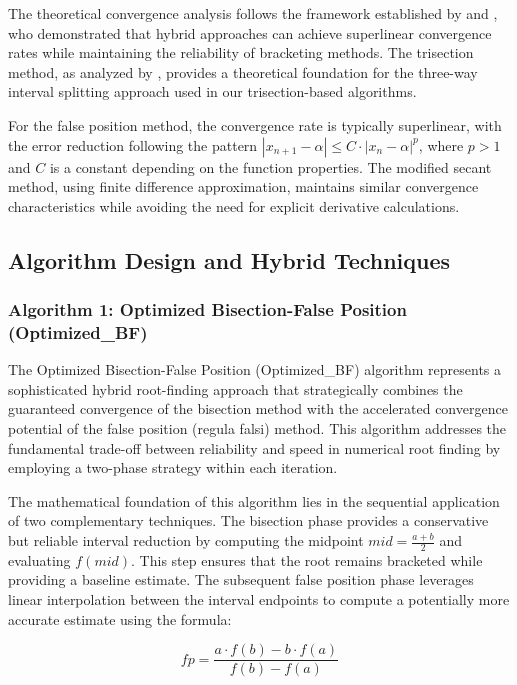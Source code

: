 \documentclass[amsmath, amssymb, aps]{revtex4-2}
\begin{document}
The theoretical convergence analysis follows the framework established by \cite{sabharwal2019blended} and \cite{badr2022novel}, who demonstrated that hybrid approaches can achieve superlinear convergence rates while maintaining the reliability of bracketing methods. The trisection method, as analyzed by \cite{demir2008trisection}, provides a theoretical foundation for the three-way interval splitting approach used in our trisection-based algorithms.

For the false position method, the convergence rate is typically superlinear, with the error reduction following the pattern $|x_{n+1} - \alpha| \leq C \cdot |x_n - \alpha|^p$, where $p > 1$ and $C$ is a constant depending on the function properties. The modified secant method, using finite difference approximation, maintains similar convergence characteristics while avoiding the need for explicit derivative calculations.

\subsection{Algorithm Design and Hybrid Techniques}

\subsubsection{Algorithm 1: Optimized Bisection-False Position (Optimized\_BF)}

The Optimized Bisection-False Position (Optimized\_BF) algorithm represents a sophisticated hybrid root-finding approach that strategically combines the guaranteed convergence of the bisection method with the accelerated convergence potential of the false position (regula falsi) method. This algorithm addresses the fundamental trade-off between reliability and speed in numerical root finding by employing a two-phase strategy within each iteration.

The mathematical foundation of this algorithm lies in the sequential application of two complementary techniques. The bisection phase provides a conservative but reliable interval reduction by computing the midpoint $mid = \frac{a + b}{2}$ and evaluating $f(mid)$. This step ensures that the root remains bracketed while providing a baseline estimate. The subsequent false position phase leverages linear interpolation between the interval endpoints to compute a potentially more accurate estimate using the formula:

\begin{equation}
fp = \frac{a \cdot f(b) - b \cdot f(a)}{f(b) - f(a)}
\end{equation}
\end{document}
